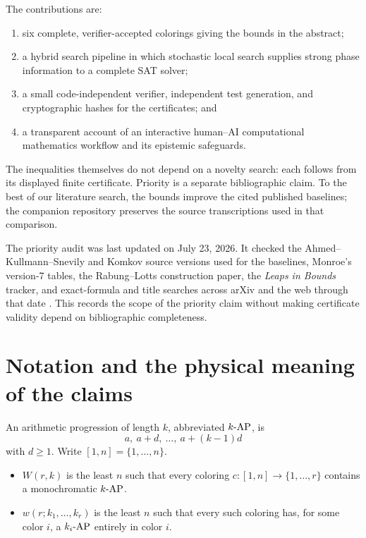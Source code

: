 \documentclass[11pt]{article}
\newcommand{\interval}[1]{[1,#1]}
\newcommand{\ap}{\textnormal{-AP}}
\begin{document}
The contributions are:

\begin{enumerate}[leftmargin=*,itemsep=2pt]
  \item six complete, verifier-accepted colorings giving the bounds in the
        abstract;
  \item a hybrid search pipeline in which stochastic local search supplies
        strong phase information to a complete SAT solver;
  \item a small code-independent verifier, independent test generation, and
        cryptographic hashes for the certificates; and
  \item a transparent account of an interactive human--AI computational
        mathematics workflow and its epistemic safeguards.
\end{enumerate}

The inequalities themselves do not depend on a novelty search: each follows
from its displayed finite certificate.  Priority is a separate bibliographic
claim.  To the best of our literature search, the bounds improve the cited
published baselines; the companion repository preserves the source
transcriptions used in that comparison.

The priority audit was last updated on July 23, 2026.  It checked the
Ahmed--Kullmann--Snevily and Komkov source versions used for the baselines,
Monroe's version-7 tables, the Rabung--Lotts construction paper, the
\emph{Leaps in Bounds} tracker, and exact-formula and title searches across
arXiv and the web through that date
\cite{ahmed2014,komkov2020,monroe2022,rabung2012,leaps2026}.  This records the
scope of the priority claim without making certificate validity depend on
bibliographic completeness.

\section{Notation and the physical meaning of the claims}
\label{sec:notation}

An arithmetic progression of length \(k\), abbreviated \(k\ap\), is
\[
  a,\ a+d,\ \ldots,\ a+(k-1)d
\]
with \(d\geq 1\).  Write \(\interval{n}=\{1,\ldots,n\}\).

\begin{itemize}[leftmargin=*]
  \item \(W(r,k)\) is the least \(n\) such that every coloring
        \(c:\interval{n}\to\{1,\ldots,r\}\) contains a monochromatic
        \(k\ap\).
  \item \(w(r;k_1,\ldots,k_r)\) is the least \(n\) such that every such
        coloring has, for some color \(i\), a \(k_i\ap\) entirely in color
        \(i\).
\end{itemize}
\end{document}
